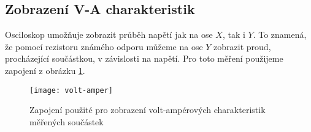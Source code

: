 \documentclass[0-protokol.tex]{subfiles}
\begin{document}
\subsection*{Zobrazení V-A charakteristik}
Osciloskop umožňuje zobrazit průběh napětí jak na ose $X$, tak i $Y$. To znamená, že pomocí rezistoru známého odporu můžeme na ose $Y$ zobrazit proud, procházející součástkou, v závislosti na napětí. Pro toto měření použijeme zapojení z obrázku \ref{fig:volt-amper}.

\begin{figure}[H]
\centering
\texttt{[image: volt-amper]}
\caption{Zapojení použité pro zobrazení volt-ampérových charakteristik měřených součástek \cite{stud_text}}
\label{fig:volt-amper}
\end{figure}
\end{document}
